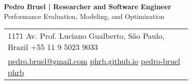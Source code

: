 \documentclass[a4paper,10pt]{article}
\date{\today}
\title{}
\begin{document}
\parbox[top][0.12\textheight][c]{\linewidth}{ %
    \vspace{-0.04\textheight} %
    \centering %
    {\LARGE \textbf{Pedro Bruel | Researcher and Software Engineer}}\\\medskip %
    {\Large Performance Evaluation, Modeling, and Optimization}
}


\parbox[top][0.12\textheight][c]{\linewidth}{ %
    \vspace{-0.17\textheight} %
    \centering
    \colorbox{shade}{ %
        \begin{supertabular}{p{0.75\linewidth}} %
            \raisebox{-1pt}{\faHome} \hspace{0.15cm} 1171 Av. Prof. Luciano Gualberto, São Paulo, Brazil \hspace{0.2cm} \raisebox{-1pt}{\faPhone} \hspace{0.14cm} +55 11 9 5023 9033 \\ %
            \raisebox{0pt}{\small\faEnvelope} \hspace{0.2cm} \href{mailto:pedro.bruel@gmail.com}{pedro.bruel@gmail.com} \hspace{0.2cm} \raisebox{0pt}{\small\faDesktop} \hspace{0.2cm} \href{https://phrb.github.io}{phrb.github.io} \hspace{0.31cm} \raisebox{-1pt}{\faLinkedin} \hspace{0.2cm} \href{https://www.linkedin.com/in/pedro-bruel}{pedro-bruel} \hspace{0.2cm} \raisebox{-1pt}{\faGithub} \hspace{0.2cm} \href{https://github.com/phrb}{phrb} \\
        \end{supertabular}
    }
}
\end{document}
